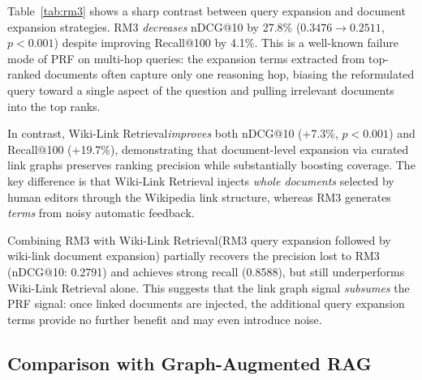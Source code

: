 \documentclass[sigconf,review]{acmart}
\newcommand{\sys}{Wiki-Link Retrieval\xspace}
\begin{document}
Table~\ref{tab:rm3} shows a sharp contrast between query expansion and
document expansion strategies.  RM3 \emph{decreases} nDCG@10 by 27.8\%
($0.3476 \to 0.2511$, $p < 0.001$) despite improving Recall@100 by 4.1\%.
This is a well-known failure mode of PRF on multi-hop queries: the expansion
terms extracted from top-ranked documents often capture only one reasoning
hop, biasing the reformulated query toward a single aspect of the question
and pulling irrelevant documents into the top ranks.

In contrast, \sys \emph{improves} both nDCG@10 (+7.3\%, $p < 0.001$) and
Recall@100 (+19.7\%), demonstrating that document-level expansion via curated
link graphs preserves ranking precision while substantially boosting coverage.
The key difference is that \sys injects \emph{whole documents} selected by
human editors through the Wikipedia link structure, whereas RM3 generates
\emph{terms} from noisy automatic feedback.

Combining RM3 with \sys (RM3 query expansion followed by wiki-link document
expansion) partially recovers the precision lost to RM3 (nDCG@10: 0.2791)
and achieves strong recall (0.8588), but still underperforms \sys alone.
This suggests that the link graph signal \emph{subsumes} the PRF signal:
once linked documents are injected, the additional query expansion terms
provide no further benefit and may even introduce noise.

\subsection{Comparison with Graph-Augmented RAG}
\label{sec:graphrag}

\begin{table}[t]
\caption{System complexity comparison.}
\label{tab:complexity}
\centering
{}
\end{table}
\end{document}
